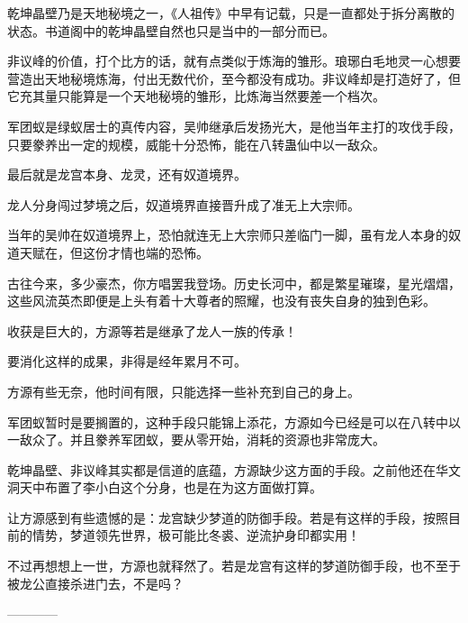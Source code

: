 \begin{this_body}
乾坤晶壁乃是天地秘境之一，《人祖传》中早有记载，只是一直都处于拆分离散的状态。书道阁中的乾坤晶壁自然也只是当中的一部分而已。

非议峰的价值，打个比方的话，就有点类似于炼海的雏形。琅琊白毛地灵一心想要营造出天地秘境炼海，付出无数代价，至今都没有成功。非议峰却是打造好了，但它充其量只能算是一个天地秘境的雏形，比炼海当然要差一个档次。

军团蚁是绿蚁居士的真传内容，吴帅继承后发扬光大，是他当年主打的攻伐手段，只要豢养出一定的规模，威能十分恐怖，能在八转蛊仙中以一敌众。

最后就是龙宫本身、龙灵，还有奴道境界。

龙人分身闯过梦境之后，奴道境界直接晋升成了准无上大宗师。

当年的吴帅在奴道境界上，恐怕就连无上大宗师只差临门一脚，虽有龙人本身的奴道天赋在，但这份才情也端的恐怖。

古往今来，多少豪杰，你方唱罢我登场。历史长河中，都是繁星璀璨，星光熠熠，这些风流英杰即便是上头有着十大尊者的照耀，也没有丧失自身的独到色彩。

收获是巨大的，方源等若是继承了龙人一族的传承！

要消化这样的成果，非得是经年累月不可。

方源有些无奈，他时间有限，只能选择一些补充到自己的身上。

军团蚁暂时是要搁置的，这种手段只能锦上添花，方源如今已经是可以在八转中以一敌众了。并且豢养军团蚁，要从零开始，消耗的资源也非常庞大。

乾坤晶壁、非议峰其实都是信道的底蕴，方源缺少这方面的手段。之前他还在华文洞天中布置了李小白这个分身，也是在为这方面做打算。

让方源感到有些遗憾的是：龙宫缺少梦道的防御手段。若是有这样的手段，按照目前的情势，梦道领先世界，极可能比冬裘、逆流护身印都实用！

不过再想想上一世，方源也就释然了。若是龙宫有这样的梦道防御手段，也不至于被龙公直接杀进门去，不是吗？

------------

\end{this_body}

